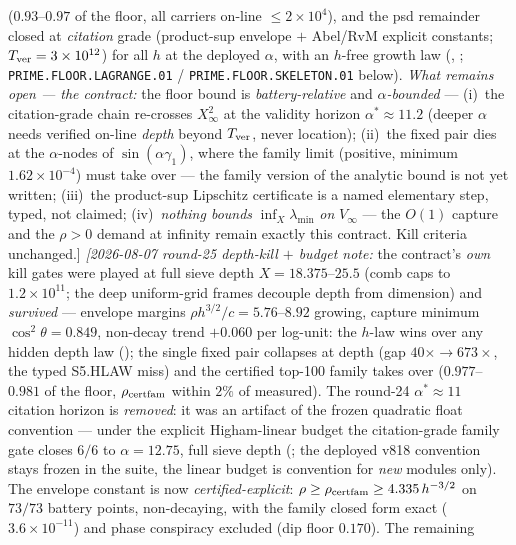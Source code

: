 \documentclass[11pt,a4paper]{article}
\begin{document}
{($0.93$--$0.97$ of the floor, all carriers on-line $\le
2\times10^4$), and the psd remainder closed at \emph{citation}
grade (product-sup envelope $+$ Abel/RvM explicit constants;
$T_{\rm ver}=3\times10^{12}$) for all $h$ at the deployed
$\alpha$, with an $h$-free growth law
(,
;
\texttt{PRIME.FLOOR.LAGRANGE.01} /
\texttt{PRIME.FLOOR.SKELETON.01} below).
\emph{What remains open --- the contract:} the floor bound is
\emph{battery-relative} and \emph{$\alpha$-bounded} --- (i)~the
citation-grade chain re-crosses $X_\infty^2$ at the validity
horizon $\alpha^*\approx11.2$ (deeper $\alpha$ needs verified
on-line \emph{depth} beyond $T_{\rm ver}$, never location);
(ii)~the fixed pair dies at the $\alpha$-nodes of
$\sin(\alpha\gamma_1)$, where the family limit (positive,
minimum $1.62\times10^{-4}$) must take over --- the family
version of the analytic bound is not yet written; (iii)~the
product-sup Lipschitz certificate is a named elementary step,
typed, not claimed; (iv)~\emph{nothing bounds}
$\inf_X\lambda_{\min}$ \emph{on} $V_\infty$ --- the $O(1)$
capture and the $\rho>0$ demand at infinity remain exactly this
contract.  Kill criteria unchanged.]
\emph{[2026-08-07 round-25 depth-kill $+$ budget note:} the
contract's \emph{own} kill gates were played at full sieve depth
$X = 18.375$--$25.5$ (comb caps to $1.2\times10^{11}$; the deep
uniform-grid frames decouple depth from dimension) and
\emph{survived} --- envelope margins $\rho h^{3/2}/c =
5.76$--$8.92$ growing, capture minimum $\cos^2\theta = 0.849$,
non-decay trend $+0.060$ per log-unit: the $h$-law wins over any
hidden depth law (); the
single fixed pair collapses at depth (gap $40\times \to
673\times$, the typed S5.HLAW miss) and the certified top-100
family takes over ($0.977$--$0.981$ of the floor,
$\rho_{\rm certfam}$ within $2\%$ of measured).  The round-24
$\alpha^*\approx11$ citation horizon is \emph{removed}: it was
an artifact of the frozen quadratic float convention --- under
the explicit Higham-linear budget the citation-grade family gate
closes $6/6$ to $\alpha = 12.75$, full sieve depth
(; the deployed v818
convention stays frozen in the suite, the linear budget is
convention for \emph{new} modules only).  The envelope constant
is now \emph{certified-explicit}: $\rho \ge \rho_{\rm certfam}
\ge 4.335\,h^{-3/2}$ on $73/73$ battery points, non-decaying,
with the family closed form exact ($3.6\times10^{-11}$) and
phase conspiracy excluded (dip floor $0.170$).  The remaining
}
\end{document}
